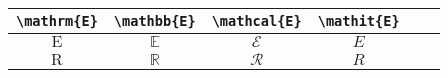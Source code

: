 \documentclass{article}
\begin{document}
\begin{table}
\begin{tabular}{|c|c|c|c|c|c}\hline
\verb|\mathrm{E}| & \verb|\mathbb{E}|& \verb|\mathcal{E}|& \verb|\mathit{E}|\\\hline
$\mathrm{E}$ & $\mathbb{E}$ & $\mathcal{E}$ & $\mathit{E}$\\\hline
$\mathrm{R}$ & $\mathbb{R}$ & $\mathcal{R}$ & $\mathit{R}$\\\hline
\end{tabular}
\end{table}
\end{document}

